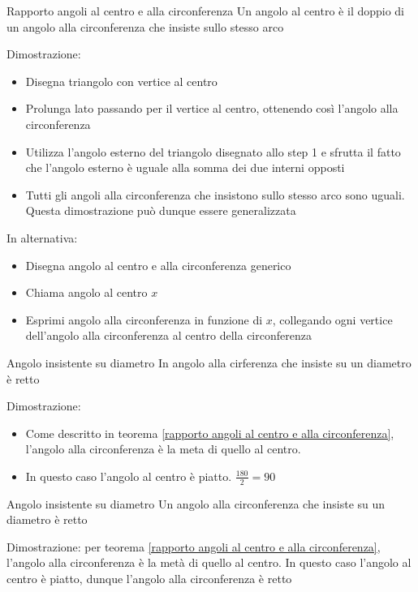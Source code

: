 \begin{teorema}{Rapporto angoli al centro e alla circonferenza}
	Un angolo al centro è il doppio di un angolo alla circonferenza che insiste sullo stesso arco
\end{teorema}\label{rapporto angoli al centro e alla circonferenza}
Dimostrazione:
\begin{itemize}
	\item Disegna triangolo con vertice al centro
	\item Prolunga lato passando per il vertice al centro, ottenendo così l'angolo alla circonferenza
	\item Utilizza l'angolo esterno del triangolo disegnato allo step 1 e sfrutta il fatto che l'angolo esterno è uguale alla somma dei due interni opposti
	\item Tutti gli angoli alla circonferenza che insistono sullo stesso arco sono uguali. Questa dimostrazione può dunque essere generalizzata
\end{itemize}
In alternativa:
\begin{itemize}
	\item Disegna angolo al centro e alla circonferenza generico
	\item Chiama angolo al centro $ x $
	\item Esprimi angolo alla circonferenza in funzione di $ x $, collegando ogni vertice dell'angolo alla circonferenza al centro della circonferenza
\end{itemize}

\begin{teorema}{Angolo insistente su diametro}
	In angolo alla cirferenza che insiste su un diametro è retto
\end{teorema}
Dimostrazione:
\begin{itemize}
	\item Come descritto in teorema \ref{rapporto angoli al centro e alla circonferenza}, l'angolo alla circonferenza è la meta di quello al centro.
	\item In questo caso l'angolo al centro è piatto. $ \frac{180}{2} = 90 $
\end{itemize}
\begin{teorema}{Angolo insistente su diametro}
	Un angolo alla circonferenza che insiste su un diametro è retto
\end{teorema}
Dimostrazione: per teorema \ref{rapporto angoli al centro e alla circonferenza}, l'angolo alla circonferenza è la metà di quello al centro. In questo caso l'angolo al centro è piatto, dunque l'angolo alla circonferenza è retto


